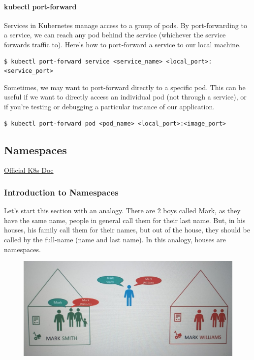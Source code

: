 \documentclass{article}
\newenvironment{codetemplate}[1][]{%
  \mybasecolorbox[#1]
  \itshape
}{%
  \endmybasecolorbox
}
\begin{document}
\paragraph{kubectl port-forward}
Services in Kubernetes manage access to a group of pods. By port-forwarding to a service, we can reach any pod behind the service (whichever the service forwards traffic to). Here's how to port-forward a service to our local machine.

\begin{codetemplate}{}
\begin{verbatim}
$ kubectl port-forward service <service_name> <local_port>:<service_port>
\end{verbatim}
\end{codetemplate}

Sometimes, we may want to port-forward directly to a specific pod. This can be useful if we want to directly access an individual pod (not through a service), or if you're testing or debugging a particular instance of our application.
\begin{codetemplate}{}
\begin{verbatim}
$ kubectl port-forward pod <pod_name> <local_port>:<image_port>
\end{verbatim}
\end{codetemplate}

\newpage
\subsection{Namespaces}

\href{https://kubernetes.io/docs/concepts/overview/working-with-objects/namespaces/}{Official K8s Doc}

\subsubsection{Introduction to Namespaces}
\label{IntNames}

Let's start this section with an analogy. There are 2 boys called Mark, as they have the same name, people in general call them for their last name. But, in his houses, his family call them for their names, but out of the house, they should be called by the full-name (name and last name). In this analogy, houses are namespaces.

\begin{figure}[H]
    \centering
    \includegraphics[scale=0.4]{pictures/namespace1.jpeg}
\end{figure}
\end{document}
